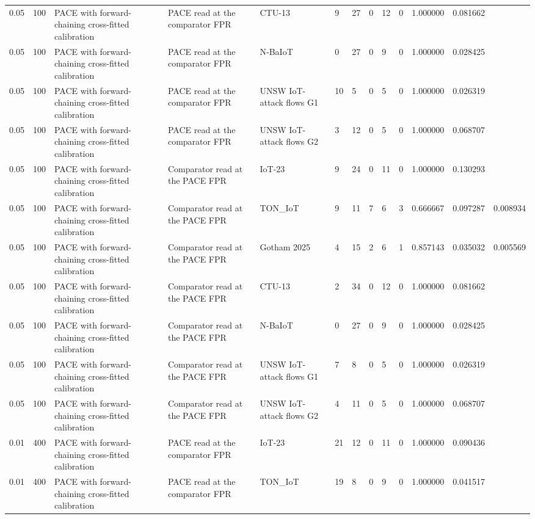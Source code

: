 \begin{tabular}{lllllllllllll}
0.05 & 100 & PACE with forward-chaining cross-fitted calibration & PACE read at the comparator FPR & CTU-13 & 9 & 27 & 0 & 12 & 0 & 1.000000 & 0.081662 &  \\
0.05 & 100 & PACE with forward-chaining cross-fitted calibration & PACE read at the comparator FPR & N-BaIoT & 0 & 27 & 0 & 9 & 0 & 1.000000 & 0.028425 &  \\
0.05 & 100 & PACE with forward-chaining cross-fitted calibration & PACE read at the comparator FPR & UNSW IoT-attack flows G1 & 10 & 5 & 0 & 5 & 0 & 1.000000 & 0.026319 &  \\
0.05 & 100 & PACE with forward-chaining cross-fitted calibration & PACE read at the comparator FPR & UNSW IoT-attack flows G2 & 3 & 12 & 0 & 5 & 0 & 1.000000 & 0.068707 &  \\
0.05 & 100 & PACE with forward-chaining cross-fitted calibration & Comparator read at the PACE FPR & IoT-23 & 9 & 24 & 0 & 11 & 0 & 1.000000 & 0.130293 &  \\
0.05 & 100 & PACE with forward-chaining cross-fitted calibration & Comparator read at the PACE FPR & TON\_IoT & 9 & 11 & 7 & 6 & 3 & 0.666667 & 0.097287 & 0.008934 \\
0.05 & 100 & PACE with forward-chaining cross-fitted calibration & Comparator read at the PACE FPR & Gotham 2025 & 4 & 15 & 2 & 6 & 1 & 0.857143 & 0.035032 & 0.005569 \\
0.05 & 100 & PACE with forward-chaining cross-fitted calibration & Comparator read at the PACE FPR & CTU-13 & 2 & 34 & 0 & 12 & 0 & 1.000000 & 0.081662 &  \\
0.05 & 100 & PACE with forward-chaining cross-fitted calibration & Comparator read at the PACE FPR & N-BaIoT & 0 & 27 & 0 & 9 & 0 & 1.000000 & 0.028425 &  \\
0.05 & 100 & PACE with forward-chaining cross-fitted calibration & Comparator read at the PACE FPR & UNSW IoT-attack flows G1 & 7 & 8 & 0 & 5 & 0 & 1.000000 & 0.026319 &  \\
0.05 & 100 & PACE with forward-chaining cross-fitted calibration & Comparator read at the PACE FPR & UNSW IoT-attack flows G2 & 4 & 11 & 0 & 5 & 0 & 1.000000 & 0.068707 &  \\
0.01 & 400 & PACE with forward-chaining cross-fitted calibration & PACE read at the comparator FPR & IoT-23 & 21 & 12 & 0 & 11 & 0 & 1.000000 & 0.090436 &  \\
0.01 & 400 & PACE with forward-chaining cross-fitted calibration & PACE read at the comparator FPR & TON\_IoT & 19 & 8 & 0 & 9 & 0 & 1.000000 & 0.041517 &  \\

\end{tabular}
